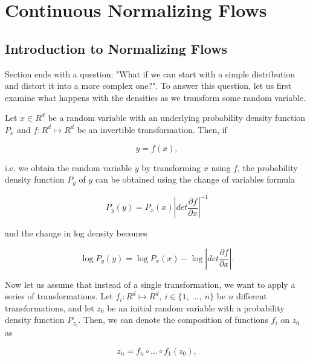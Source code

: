 \chapter{Continuous Normalizing Flows}
\label{chapter:cnf}

\section{Introduction to Normalizing Flows}
\label{section:cnf:normalizing_flows}

Section ends with a question: "What if we can start with a simple distribution and distort it into a more complex one?". To answer this question, let us first examine what happens with the densities as we transform some random variable.

Let $ x \in R^d $ be a random variable with an underlying probability density function $ P_x $ and $ f: R^d \mapsto R^d $ be an invertible transformation. Then, if

\begin{displaymath}
    y = f(x),
\end{displaymath}

i.e. we obtain the random variable $ y $ by transforming $ x $ using $ f $, the probability density function $ P_y $ of $ y $ can be obtained using the change of variables formula

\begin{equation}
    \label{equation:cnf:nf:change_density}
    P_y(y) = P_x(x) \left | det \frac{\partial f}{\partial x} \right |^{-1}
\end{equation}

and the change in log density becomes

\begin{equation}
    \label{equation:cnf:nf:change_log_density}
    \log P_y(y) = \log P_x(x) - \log \left | det \frac{\partial f}{\partial x} \right |.
\end{equation}

Now let us assume that instead of a single transformation, we want to apply a series of transformations. Let $ f_i: R^d \mapsto R^d, \ i \in \{1, \ ..., \ n\} $ be $ n $ different transformations, and let $ z_0 $ be an initial random variable with a probability density function $ P_{z_0} $. Then, we can denote the composition of functions $ f_i $ on $ z_0 $ as

\begin{displaymath}
    z_n = f_n \circ ... \circ f_1(z_0),
\end{displaymath}

